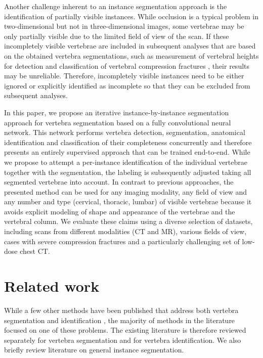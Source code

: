 \documentclass[authoryear,5p,final,times]{elsarticle}
\begin{document}
    Another challenge inherent to an instance segmentation approach is the identification of partially visible instances. While occlusion is a typical problem in two-dimensional but not in three-dimensional images, some vertebrae may be only partially visible due to the limited field of view of the scan. If these incompletely visible vertebrae are included in subsequent analyses that are based on the obtained vertebra segmentations, such as measurement of vertebral heights for detection and classification of vertebral compression fractures \citep{Grigoryan2003}, their results may be unreliable. Therefore, incompletely visible instances need to be either ignored or explicitly identified as incomplete so that they can be excluded from subsequent analyses.
    
    In this paper, we propose an iterative instance-by-instance segmentation approach for vertebra segmentation based on a fully convolutional neural network. This network performs vertebra detection, segmentation, anatomical identification and classification of their completeness concurrently and therefore presents an entirely supervised approach that can be trained end-to-end. While we propose to attempt a per-instance identification of the individual vertebrae together with the segmentation, the labeling is subsequently adjusted taking all segmented vertebrae into account. In contrast to previous approaches, the presented method can be used for any imaging modality, any field of view and any number and type (cervical, thoracic, lumbar) of visible vertebrae because it avoids explicit modeling of shape and appearance of the vertebrae and the vertebral column. We evaluate these claims using a diverse selection of datasets, including scans from different modalities (CT and MR), various fields of view, cases with severe compression fractures and a particularly challenging set of low-dose chest CT.
            
    \section{Related work}
        
    While a few other methods have been published that address both vertebra segmentation and identification \citep{Klinder2009,Kelm2013,Chu2015,Suzani2015,Sekuboyina2017}, the majority of methods in the literature focused on one of these problems. The existing literature is therefore reviewed separately for vertebra segmentation and for vertebra identification. We also briefly review literature on general instance segmentation.
    
\end{document}
